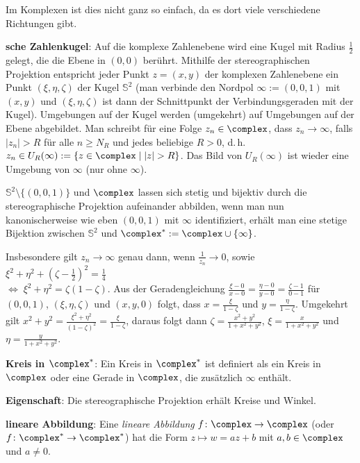 Im Komplexen ist dies nicht ganz so einfach, da es dort viele verschiedene
Richtungen gibt.

\linie

\textbf{sche Zahlenkugel}:
Auf die komplexe Zahlenebene wird eine Kugel mit Radius $\frac{1}{2}$ gelegt,
die die Ebene in $(0, 0)$ berührt.
Mithilfe der stereographischen Projektion entspricht jeder Punkt $z = (x, y)$
der komplexen Zahlenebene ein Punkt $(\xi, \eta, \zeta)$ der Kugel
$\mathbb{S}^2$
(man verbinde den Nordpol $\infty := (0, 0, 1)$ mit $(x, y)$ und
$(\xi, \eta, \zeta)$ ist dann der Schnittpunkt der Verbindungsgeraden mit der
Kugel).
Umgebungen auf der Kugel werden (umgekehrt) auf Umgebungen auf der Ebene
abgebildet.
Man schreibt für eine Folge $z_n \in \complex$, dass $z_n \to \infty$,
falls $|z_n| > R$ für alle $n \ge N_R$ und jedes beliebige $R > 0$, d.\,h.
$z_n \in U_R(\infty) := \{z \in \complex \;|\; |z| > R\}$.
Das Bild von $U_R(\infty)$ ist wieder eine Umgebung von $\infty$ (nur ohne
$\infty$).

$\mathbb{S}^2 \setminus \{(0, 0, 1)\}$ und $\complex$ lassen sich stetig und
bijektiv durch die stereographische Projektion aufeinander abbilden,
wenn man nun kanonischerweise wie eben $(0, 0, 1)$ mit $\infty$ identifiziert,
erhält man eine stetige Bijektion zwischen $\mathbb{S}^2$ und
$\complex^\ast := \complex \cup \{\infty\}$.

Insbesondere gilt $z_n \to \infty$ genau dann, wenn $\frac{1}{z_n} \to 0$,
sowie $\xi^2 + \eta^2 + (\zeta - \frac{1}{2})^2 = \frac{1}{4}$\\
$\iff\; \xi^2 + \eta^2 = \zeta (1 - \zeta)$.
Aus der Geradengleichung $\frac{\xi - 0}{x - 0} = \frac{\eta - 0}{y - 0} =
\frac{\zeta - 1}{0 - 1}$ für $(0, 0, 1)$, $(\xi, \eta, \zeta)$ und
$(x, y, 0)$ folgt, dass $x = \frac{\xi}{1 - \zeta}$ und
$y = \frac{\eta}{1 - \zeta}$.
Umgekehrt gilt $x^2 + y^2 = \frac{\xi^2 + \eta^2}{(1 - \zeta)^2} =
\frac{\xi}{1 - \zeta}$, daraus folgt dann
$\zeta = \frac{x^2 + y^2}{1 + x^2 + y^2}$,
$\xi = \frac{x}{1 + x^2 + y^2}$ und $\eta = \frac{y}{1 + x^2 + y^2}$.

\linie

\textbf{Kreis in $\complex^\ast$}:
Ein Kreis in $\complex^\ast$ ist definiert als ein Kreis in $\complex$ oder
eine Gerade in $\complex$, die zusätzlich $\infty$ enthält.

\textbf{Eigenschaft}:
Die stereographische Projektion erhält Kreise und Winkel.

\linie
\pagebreak

\textbf{lineare Abbildung}:
Eine \emph{lineare Abbildung} $f\colon \complex \rightarrow \complex$
(oder $f\colon \complex^\ast \rightarrow \complex^\ast$) hat die Form
$z \mapsto w = az + b$ mit $a, b \in \complex$ und $a \not= 0$.

